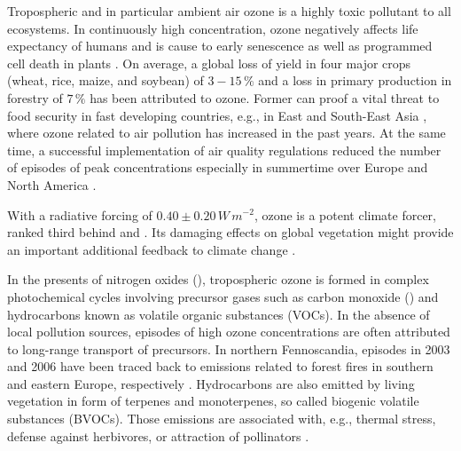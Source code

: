 \documentclass[bg, manuscript]{copernicus}
\begin{document}
Tropospheric and in particular ambient air ozone is a highly toxic pollutant to all ecosystems. In continuously high concentration, ozone negatively affects life expectancy of humans \citep{WHO2008} and is cause to early senescence as well as programmed cell death in plants \citep{PCE:Kangasjarvi2005}. On average, a global loss of yield in four major crops (wheat, rice, maize, and soybean) of $3-15\,\unit{\%}$ \citep{PJ:Ainsworth2017} and a loss in primary production in forestry of $7\,\unit{\%}$ \citep{GCB:Wittig2009,EP:Matyssek2012} has been attributed to ozone. Former can proof a vital threat to food security in fast developing countries, e.g., in East and South-East Asia \citep{GCB:Tang2013,NCC:Tai2014,AE:Chuwah2015,GCB:Mills2018}, where ozone related to air pollution has increased in the past years. At the same time, a successful implementation of air quality regulations reduced the number of episodes of peak concentrations especially in summertime over Europe and North America \citep[e.g.,][]{ESA:Fleming2018, ESA:Mills2018}.

With a radiative forcing of $0.40 \pm 0.20\,\unit{W\,m^{-2}}$, ozone is a potent climate forcer, ranked third behind  and  \citep[Chapter 8]{IPCC2013}. Its damaging effects on global vegetation might provide an important additional feedback to climate change \citep{Nat:Sitch2007}.

In the presents of nitrogen oxides (), tropospheric ozone is formed in complex photochemical cycles involving precursor gases such as carbon monoxide () and hydrocarbons known as volatile organic substances (VOCs). In the absence of local pollution sources, episodes of high ozone concentrations are often attributed to long-range transport of precursors. In northern Fennoscandia, episodes in 2003 and 2006 have been traced back to emissions related to forest fires in southern and eastern Europe, respectively \citep{AE:Lindskog2007,EP:Karlsson2013}. Hydrocarbons are also emitted by living vegetation in form of terpenes and monoterpenes, so called biogenic volatile substances (BVOCs). Those emissions are associated with, e.g., thermal stress, defense against herbivores, or attraction of pollinators \citep{TPS:Penuelas2003}.
\end{document}
